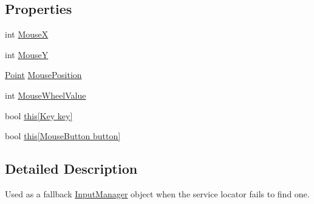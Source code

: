 \subsection*{Properties}
\begin{DoxyCompactItemize}
\item 
int \hyperlink{class_tri_devs_1_1_tri_engine2_d_1_1_input_1_1_null_input_manager_a4d2bafa6eb9ebc0be564e472c2c50cd2}{Mouse\-X}
\item 
int \hyperlink{class_tri_devs_1_1_tri_engine2_d_1_1_input_1_1_null_input_manager_af5cd8b1160c3d8e89f45f2ca05d6ef5a}{Mouse\-Y}
\item 
\hyperlink{struct_tri_devs_1_1_tri_engine2_d_1_1_point}{Point} \hyperlink{class_tri_devs_1_1_tri_engine2_d_1_1_input_1_1_null_input_manager_aad7209f97294a7ce7bbb9cc9295d21dd}{Mouse\-Position}
\item 
int \hyperlink{class_tri_devs_1_1_tri_engine2_d_1_1_input_1_1_null_input_manager_a7afee03cecf29b1cc123fe7a03b239df}{Mouse\-Wheel\-Value}
\item 
bool \hyperlink{class_tri_devs_1_1_tri_engine2_d_1_1_input_1_1_null_input_manager_ad1553333590d5c3e37df8e3ee0b6e69b}{this\mbox{[}\-Key key\mbox{]}}
\item 
bool \hyperlink{class_tri_devs_1_1_tri_engine2_d_1_1_input_1_1_null_input_manager_ac72562b9f98a5865412cd12ce87c6fbb}{this\mbox{[}\-Mouse\-Button button\mbox{]}}
\end{DoxyCompactItemize}


\subsection{Detailed Description}
Used as a fallback \hyperlink{class_tri_devs_1_1_tri_engine2_d_1_1_input_1_1_input_manager}{Input\-Manager} object when the service locator fails to find one. 




